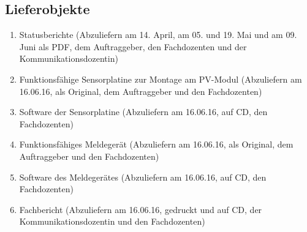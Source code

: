 \subsection{Lieferobjekte}
\begin{enumerate}
\item	Statusberichte (Abzuliefern am 14. April, am 05. und 19. Mai und am 09. Juni als PDF, dem Auftraggeber, den Fachdozenten und der Kommunikationsdozentin)

\item Funktionsfähige Sensorplatine zur Montage am PV-Modul (Abzuliefern am 16.06.16, als Original, dem Auftraggeber und den Fachdozenten)

\item Software der Sensorplatine (Abzuliefern am 16.06.16, auf CD, den Fachdozenten)

\item Funktionsfähiges Meldegerät (Abzuliefern am 16.06.16, als Original, dem Auftraggeber und den Fachdozenten)

\item Software des Meldegerätes (Abzuliefern am 16.06.16, auf CD, den Fachdozenten)

\item Fachbericht (Abzuliefern am 16.06.16, gedruckt und auf CD, der Kommunikationsdozentin und den Fachdozenten)
	
\end{enumerate}
%